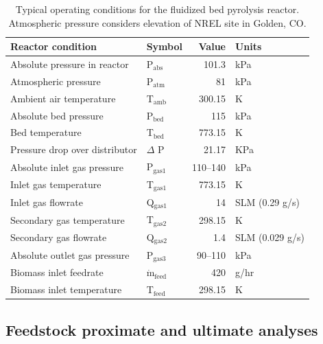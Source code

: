 \documentclass[12pt,titlepage]{article}
\begin{document}
\begin{table}[H]
    \centering
    \caption{Typical operating conditions for the fluidized bed pyrolysis reactor. Atmospheric pressure considers elevation of NREL site in Golden, CO.}
    \label{tab:operating}
    \begin{tabular}{llrl}
        \toprule
        Reactor condition & Symbol & Value & Units \\
        \midrule
        Absolute pressure in reactor   & P$_{\textrm{abs}}$  & 101.3     & kPa \\
        Atmospheric pressure           & P$_{\textrm{atm}}$  & 81        & kPa \\
        Ambient air temperature        & T$_{\textrm{amb}}$  & 300.15    & K \\
        Absolute bed pressure          & P$_{\textrm{bed}}$  & 115       & kPa  \\
        Bed temperature                & T$_{\textrm{bed}}$  & 773.15    & K \\
        Pressure drop over distributor & $\Delta$ P          & 21.17     & KPa \\
        Absolute inlet gas pressure    & P$_{\textrm{gas1}}$ & 110--140  & kPa \\
        Inlet gas temperature          & T$_{\textrm{gas1}}$ & 773.15    & K \\
        Inlet gas flowrate             & Q$_{\textrm{gas1}}$ & 14        & SLM (0.29 g/s) \\
        Secondary gas temperature      & T$_{\textrm{gas2}}$ & 298.15    & K \\
        Secondary gas flowrate         & Q$_{\textrm{gas2}}$ & 1.4       & SLM (0.029 g/s) \\
        Absolute outlet gas pressure   & P$_{\textrm{gas3}}$ & 90--110   & kPa \\
        Biomass inlet feedrate         & $\dot{{\textrm{m}}}_{\textrm{feed}}$ & 420 & g/hr \\
        Biomass inlet temperature      & T$_{\textrm{feed}}$ & 298.15    & K \\
        \bottomrule
    \end{tabular}
\end{table}

\subsection{Feedstock proximate and ultimate analyses}
\end{document}
